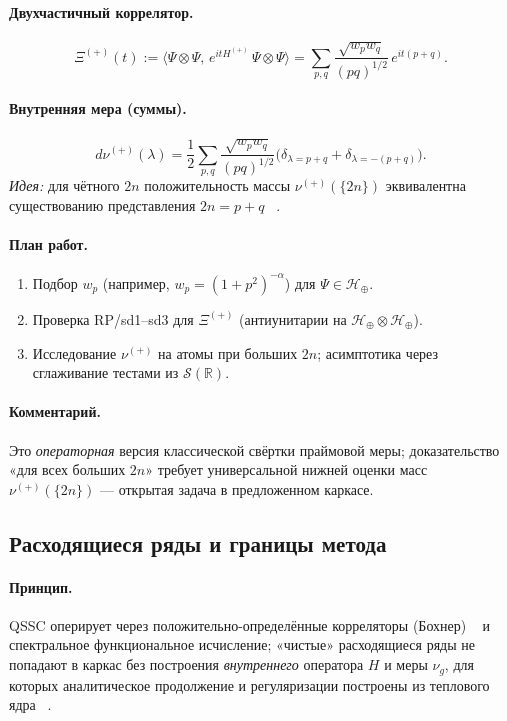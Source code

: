 \documentclass{article}
\numberwithin{equation}{section}
\theoremstyle{plain}
\theoremstyle{definition}
\theoremstyle{remark}
\def\alpha{α}\def\beta{β}\def\gamma{γ}\def\Gamma{Γ}%
\def\delta{δ}\def\Delta{Δ}\def\epsilon{ε}\def\zeta{ζ}%
\begin{document}
\paragraph{Двухчастичный коррелятор.}
\begin{equation}
\Xi^{(+)}(t):=\langle \Psi\!\otimes\!\Psi,\,e^{it H^{(+)}}\,\Psi\!\otimes\!\Psi\rangle
=\sum_{p,q} \frac{\sqrt{w_p w_q}}{(pq)^{1/2}}\,e^{it(p+q)}.
\end{equation}

\paragraph{Внутренняя мера (суммы).}
\begin{equation}
d\nu^{(+)}(\lambda)
=\frac12\sum_{p,q}\frac{\sqrt{w_p w_q}}{(pq)^{1/2}}
\big(\delta_{\lambda=p+q}+\delta_{\lambda=-(p+q)}\big).
\end{equation}
\emph{Идея:} для чётного \(2n\) положительность массы \(\nu^{(+)}(\{2n\})\) эквивалентна существованию представления \(2n=p+q\) ~\cite{IwaniecKowalski2004, Montgomery1973}.
\paragraph{План работ.}
\begin{enumerate}
\item Подбор \(w_p\) (например, \(w_p=(1+p^2)^{-\alpha}\)) для \(\Psi\in\mathcal H_\oplus\).
\item Проверка RP/sd1–sd3 для \(\Xi^{(+)}\) (антиунитарии на \(\mathcal H_{\oplus}\otimes\mathcal H_{\oplus}\)).
\item Исследование \(\nu^{(+)}\) на атомы при больших \(2n\); асимптотика через сглаживание тестами из \(\mathcal S(\mathbb R)\).
\end{enumerate}
\paragraph{Комментарий.}
Это \emph{операторная} версия классической свёртки праймовой меры; доказательство «для всех больших \(2n\)» требует универсальной нижней оценки масс \(\nu^{(+)}(\{2n\})\) — открытая задача в предложенном каркасе.

\subsection*{Расходящиеся ряды и границы метода}
\paragraph{Принцип.}
QSSC оперирует через положительно-определённые корреляторы (Бохнер) ~\cite{Bochner1933} и спектральное функциональное исчисление; «чистые» расходящиеся ряды не попадают в каркас без построения \emph{внутреннего} оператора \(H\) и меры \(\nu_g\), для которых аналитическое продолжение и регуляризации построены из теплового ядра ~\cite{Seeley1967, Hawking1977}.
\end{document}
